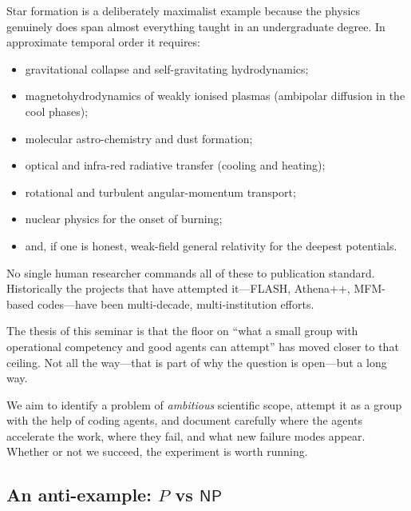 \begin{intuition}
  Star formation is a deliberately maximalist example
  because the physics genuinely does span almost everything
  taught in an undergraduate degree.  In approximate temporal
  order it requires:
  \begin{itemize}
    \item gravitational collapse and self-gravitating
      hydrodynamics;
    \item magnetohydrodynamics of weakly ionised plasmas
      (ambipolar diffusion in the cool phases);
    \item molecular astro-chemistry and dust formation;
    \item optical and infra-red radiative transfer
      (cooling and heating);
    \item rotational and turbulent angular-momentum
      transport;
    \item nuclear physics for the onset of burning;
    \item and, if one is honest, weak-field general
      relativity for the deepest potentials.
  \end{itemize}
  No single human researcher commands all of these to
  publication standard.  Historically the projects that have
  attempted it---FLASH, Athena++, MFM-based codes---have been
  multi-decade, multi-institution efforts.
\end{intuition}

The thesis of this seminar is that the floor on ``what a
small group with operational competency and good agents can
attempt'' has moved closer to that ceiling.  Not all the
way---that is part of why the question is open---but a long
way.

\begin{keyresult}
  We aim to identify a problem of \emph{ambitious} scientific
  scope, attempt it as a group with the help of coding
  agents, and document carefully where the agents accelerate
  the work, where they fail, and what new failure modes
  appear.  Whether or not we succeed, the experiment is
  worth running.
\end{keyresult}

\subsection{An anti-example: $P$ vs $\textsf{NP}$}

